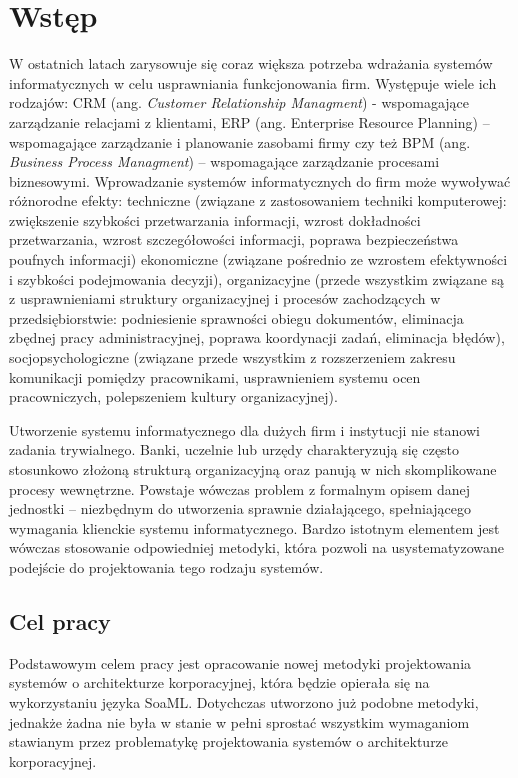 \chapter{Wstęp}
W ostatnich latach zarysowuje się coraz większa potrzeba wdrażania systemów informatycznych w celu usprawniania funkcjonowania firm. Występuje wiele ich rodzajów: CRM (ang. \emph{Customer Relationship Managment}) - wspomagające zarządzanie relacjami z klientami, ERP (ang. Enterprise Resource Planning) – wspomagające zarządzanie i planowanie zasobami firmy czy też BPM (ang. \emph{Business Process Managment}) – wspomagające zarządzanie procesami biznesowymi. Wprowadzanie systemów informatycznych do firm może wywoływać różnorodne efekty: techniczne (związane z zastosowaniem techniki komputerowej: zwiększenie szybkości przetwarzania informacji, wzrost dokładności przetwarzania, wzrost szczegółowości informacji, poprawa bezpieczeństwa poufnych informacji) ekonomiczne (związane pośrednio ze wzrostem efektywności i szybkości podejmowania decyzji), organizacyjne (przede wszystkim związane są z usprawnieniami struktury organizacyjnej i procesów zachodzących w przedsiębiorstwie: podniesienie sprawności obiegu dokumentów, eliminacja zbędnej pracy administracyjnej, poprawa koordynacji zadań, eliminacja błędów), socjopsychologiczne (związane przede wszystkim z rozszerzeniem zakresu komunikacji pomiędzy pracownikami, usprawnieniem systemu ocen pracowniczych, polepszeniem kultury organizacyjnej). \cite{EfektyZasSys}

Utworzenie systemu informatycznego dla dużych firm i instytucji nie stanowi zadania trywialnego. Banki, uczelnie lub urzędy charakteryzują się często stosunkowo złożoną strukturą organizacyjną oraz panują w nich skomplikowane procesy wewnętrzne. Powstaje wówczas problem z formalnym opisem danej jednostki – niezbędnym do utworzenia sprawnie działającego, spełniającego wymagania klienckie systemu informatycznego. Bardzo istotnym elementem jest wówczas stosowanie odpowiedniej metodyki, która pozwoli na usystematyzowane podejście do projektowania tego rodzaju systemów. 

\section{Cel pracy}
Podstawowym celem pracy jest opracowanie nowej metodyki projektowania systemów o architekturze korporacyjnej, która będzie opierała się na wykorzystaniu języka SoaML. Dotychczas utworzono już podobne metodyki, jednakże żadna nie była w stanie w pełni sprostać wszystkim wymaganiom stawianym przez problematykę projektowania systemów o architekturze korporacyjnej. 

